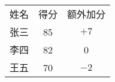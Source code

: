 \documentclass[nofonts]{ctexart}
\begin{document}
\begin{tabu}{ccc}
	\hline
	\rowfont{\bfseries}
	姓名	& 得分	& 额外加分	\\
	张三	& 85	& $+7$		\\
	\rowfont{\itshape}
	李四	& 82	& 0			\\
	王五	& 70	& $-2$		\\
	\hline
\end{tabu}
\end{document}
